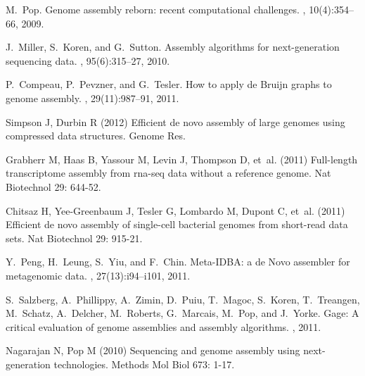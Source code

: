 \documentclass[10pt,draft]{article}
\begin{document}
\begin{thebibliography}{10}

M.~Pop.
\newblock Genome assembly reborn: recent computational challenges.
, 10(4):354--66, 2009.

J.~Miller, S.~Koren, and G.~Sutton.
\newblock Assembly algorithms for next-generation sequencing data.
, 95(6):315--27, 2010.

P.~Compeau, P.~Pevzner, and G.~Tesler.
\newblock How to apply de {B}ruijn graphs to genome assembly.
, 29(11):987--91, 2011.

Simpson J, Durbin R (2012) Efficient de novo assembly of large genomes using
  compressed data structures.
\newblock Genome Res.

Grabherr M, Haas B, Yassour M, Levin J, Thompson D, et~al. (2011) Full-length
  transcriptome assembly from rna-seq data without a reference genome.
\newblock Nat Biotechnol 29: 644-52.

Chitsaz H, Yee-Greenbaum J, Tesler G, Lombardo M, Dupont C, et~al. (2011)
  Efficient de novo assembly of single-cell bacterial genomes from short-read
  data sets.
\newblock Nat Biotechnol 29: 915-21.

Y.~Peng, H.~Leung, S.~Yiu, and F.~Chin.
\newblock Meta-IDBA: a de Novo assembler for metagenomic data.
, 27(13):i94--i101, 2011.

S.~Salzberg, A.~Phillippy, A.~Zimin, D.~Puiu, T.~Magoc, S.~Koren, T.~Treangen,
  M.~Schatz, A.~Delcher, M.~Roberts, G.~Marcais, M.~Pop, and J.~Yorke.
\newblock Gage: A critical evaluation of genome assemblies and assembly
  algorithms.
, 2011.

Nagarajan N, Pop M (2010) Sequencing and genome assembly using next-generation
  technologies.
\newblock Methods Mol Biol 673: 1-17.


\end{thebibliography}
\end{document}
